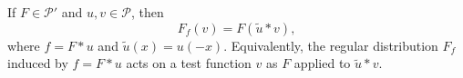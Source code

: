If $F \in \mathcal{P}'$ and $u, v \in \mathcal{P}$, then
$$F_f(v) = F(\tilde{u} * v),$$
where $f = F * u$ and $\tilde{u}(x) = u(-x)$.
Equivalently, the regular distribution $F_f$ induced by $f = F * u$ acts on a test function $v$ as $F$ applied to $\tilde{u} * v$.
